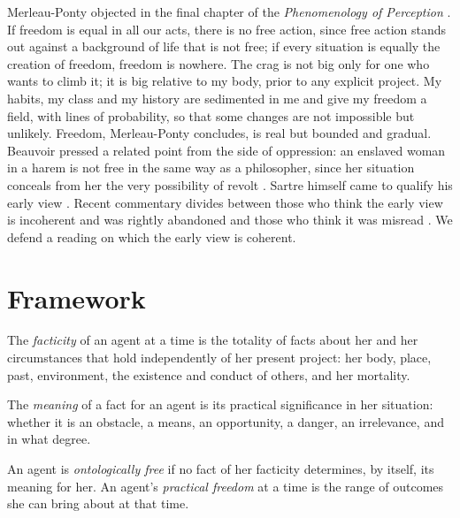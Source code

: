 \documentclass{situationist-preprint}
\begin{document}
Merleau-Ponty objected in the final chapter of the \emph{Phenomenology of Perception} \citep{MerleauPonty1945}. If freedom is equal in all our acts, there is no free action, since free action stands out against a background of life that is not free; if every situation is equally the creation of freedom, freedom is nowhere. The crag is not big only for one who wants to climb it; it is big relative to my body, prior to any explicit project. My habits, my class and my history are sedimented in me and give my freedom a field, with lines of probability, so that some changes are not impossible but unlikely. Freedom, Merleau-Ponty concludes, is real but bounded and gradual. Beauvoir pressed a related point from the side of oppression: an enslaved woman in a harem is not free in the same way as a philosopher, since her situation conceals from her the very possibility of revolt \citep{Beauvoir1947}. Sartre himself came to qualify his early view \citep{Sartre1960}. Recent commentary divides between those who think the early view is incoherent and was rightly abandoned and those who think it was misread \citep{Kruks1990,Webber2009}. We defend a reading on which the early view is coherent.

\section{Framework}

\begin{definition}[Facticity]\label{d:fact}
The \emph{facticity} of an agent at a time is the totality of facts about her and her circumstances that hold independently of her present project: her body, place, past, environment, the existence and conduct of others, and her mortality.
\end{definition}

\begin{definition}\label{d:mean}
The \emph{meaning} of a fact for an agent is its practical significance in her situation: whether it is an obstacle, a means, an opportunity, a danger, an irrelevance, and in what degree.
\end{definition}

\begin{definition}\label{d:free}
An agent is \emph{ontologically free} if no fact of her facticity determines, by itself, its meaning for her. An agent's \emph{practical freedom} at a time is the range of outcomes she can bring about at that time.
\end{definition}
\end{document}
